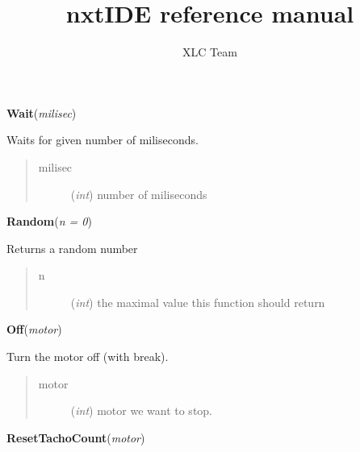 \documentclass[10pt,a4paper]{article}
\title{nxtIDE reference manual}
\author{XLC Team}
\date{}
\begin{document}
\maketitle

\vspace{6pt}
{\bf Wait}({\it milisec}) 
    
    Waits for given number of miliseconds.


    

\begin{quote}
    \begin{description}
        
\item[milisec] ({\emph{int}}) number of miliseconds

    \end{description}
\end{quote}

 

\vspace{6pt}
{\bf Random}({\it n = 0}) 
    
    Returns a random number


    

\begin{quote}
    \begin{description}
        
\item[n] ({\emph{int}}) the maximal value this function should return

    \end{description}
\end{quote}

 

\vspace{6pt}
{\bf Off}({\it motor}) 
    
    Turn the motor off (with break).
    

    

\begin{quote}
    \begin{description}
        
\item[motor] ({\emph{int}}) motor we want to stop.

    \end{description}
\end{quote}

 

\vspace{6pt}
{\bf ResetTachoCount}({\it motor}) 
    
\end{document}
